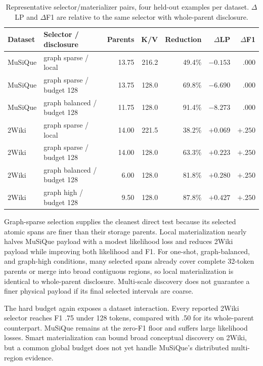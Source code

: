 \documentclass[11pt]{article}
\begin{document}
\begin{table}[H]
\centering
\caption{Representative selector/materializer pairs, four held-out examples per dataset.  $\Delta$
LP and $\Delta$F1 are relative to the same selector with whole-parent disclosure.}
\label{tab:factorial}
\small
\begin{tabular}{llrrrrr}
\toprule
Dataset & Selector / disclosure & Parents & K/V & Reduction & $\Delta$LP & $\Delta$F1 \\
\midrule
MuSiQue & graph sparse / local & 13.75 & 216.2 & 49.4\% & $-0.153$ & .000 \\
MuSiQue & graph sparse / budget 128 & 13.75 & 128.0 & 69.8\% & $-6.690$ & .000 \\
MuSiQue & graph balanced / budget 128 & 11.75 & 128.0 & 91.4\% & $-8.273$ & .000 \\
\midrule
2Wiki & graph sparse / local & 14.00 & 221.5 & 38.2\% & $+0.069$ & $+.250$ \\
2Wiki & graph sparse / budget 128 & 14.00 & 128.0 & 63.3\% & $+0.223$ & $+.250$ \\
2Wiki & graph balanced / budget 128 & 6.00 & 128.0 & 81.8\% & $+0.280$ & $+.250$ \\
2Wiki & graph high / budget 128 & 9.50 & 128.0 & 87.8\% & $+0.427$ & $+.250$ \\
\bottomrule
\end{tabular}
\end{table}

Graph-sparse selection supplies the cleanest direct test because its selected atomic spans are
finer than their storage parents.  Local materialization nearly halves MuSiQue payload with a
modest likelihood loss and reduces 2Wiki payload while improving both likelihood and F1.  For
one-shot, graph-balanced, and graph-high conditions, many selected spans already cover complete
32-token parents or merge into broad contiguous regions, so local materialization is identical to
whole-parent disclosure.  Multi-scale discovery does not guarantee a finer physical payload if
its final selected intervals are coarse.

The hard budget again exposes a dataset interaction.  Every reported 2Wiki selector reaches F1
.75 under 128 tokens, compared with .50 for its whole-parent counterpart.  MuSiQue remains at the
zero-F1 floor and suffers large likelihood losses.  Smart materialization can bound broad
conceptual discovery on 2Wiki, but a common global budget does not yet handle MuSiQue's distributed
multi-region evidence.
\end{document}
